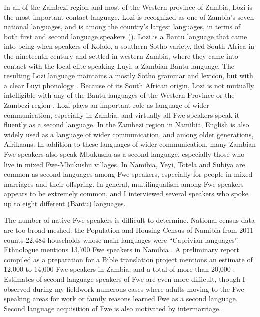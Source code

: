 In all of the Zambezi region and most of the Western province of Zambia, Lozi is the most important contact language. Lozi is recognized as one of Zambia’s seven national languages, and is among the country’s largest languages, in terms of both first and second language speakers (\citealt{MartenKula2008}). Lozi is a Bantu language that came into being when speakers of Kololo, a southern Sotho variety, fled South Africa in the nineteenth century and settled in western Zambia, where they came into contact with the local elite speaking Luyi, a Zambian Bantu language. The resulting Lozi language maintains a mostly Sotho grammar and lexicon, but with a clear Luyi phonology \citep{Gowlett1989}. Because of its South African origin, Lozi is not mutually intelligible with any of the Bantu languages of the Western Province or the Zambezi region \citep{Seidel2005}. Lozi plays an important role as language of wider communication, especially in Zambia, and virtually all Fwe speakers speak it fluently as a second language. In the Zambezi region in Namibia, English is also widely used as a language of wider communication, and among older generations, Afrikaans. In addition to these languages of wider communication, many Zambian Fwe speakers also speak Mbukushu as a second language, especially those who live in mixed Fwe-Mbukushu villages. In Namibia, Yeyi, Totela and Subiya are common as second languages among Fwe speakers, especially for people in mixed marriages and their offspring. In general, multilingualism among Fwe speakers appears to be extremely common, and I interviewed several speakers who spoke up to eight different (Bantu) languages.

The number of native Fwe speakers is difficult to determine. National census data are too broad-meshed: the Population and Housing Census of Namibia from 2011 counts 22,484 households whose main languages were “Caprivian languages”. Ethnologue mentions 13,700 Fwe speakers in Namibia \citep{EberhardEtAl2021}. A preliminary report compiled as a preparation for a Bible translation project mentions an estimate of 12,000 to 14,000 Fwe speakers in Zambia, and a total of more than 20,000 \citep{SakuhukaEtAl2011}. Estimates of second language speakers of Fwe are even more difficult, though I observed during my fieldwork numerous cases where adults moving to the Fwe-speaking areas for work or family reasons learned Fwe as a second language. Second language acquisition of Fwe is also motivated by intermarriage.

